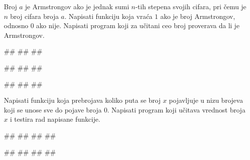 \begin{Exercise}[label=p1.4_15]
Broj $a$ je Armstrongov ako je jednak sumi $n$-tih stepena svojih
cifara, pri čemu je $n$ broj cifara broja $a$.  Napisati funkciju
 koja vraća $1$ ako je broj Armstrongov,
odnosno $0$ ako nije.  Napisati program koji za učitani ceo broj
proverava da li je Armstrongov.

\begin{miditest}
\begin{upotreba}{1}
#\naslovInt#
##
##
\end{upotreba}
\end{miditest}
\begin{miditest}
\begin{upotreba}{2}
#\naslovInt#
##
##
\end{upotreba}
\end{miditest}

\begin{miditest}
\begin{upotreba}{3}
#\naslovInt#
##
##
\end{upotreba}
\end{miditest}

\end{Exercise}
\ifresenja 
\begin{Answer}[ref=p1.4_15]
\end{Answer} 
\fi


\begin{Exercise}[label=p1.4_17] 
Napisati funkciju  koja prebrojava
koliko puta se broj $x$ pojavljuje u nizu brojeva koji se unose sve do
pojave broja $0$. Napisati program koji učitava vrednost broja $x$ i
testira rad napisane funkcije.

\begin{miditest}
\begin{upotreba}{1}
#\naslovInt#
##
##
##
\end{upotreba}
\end{miditest}
\begin{miditest}
\begin{upotreba}{2}
#\naslovInt#
##
##
##
\end{upotreba}
\end{miditest}

\end{Exercise}
\ifresenja 
\begin{Answer}[ref=p1.4_17]
\end{Answer} 
\fi


